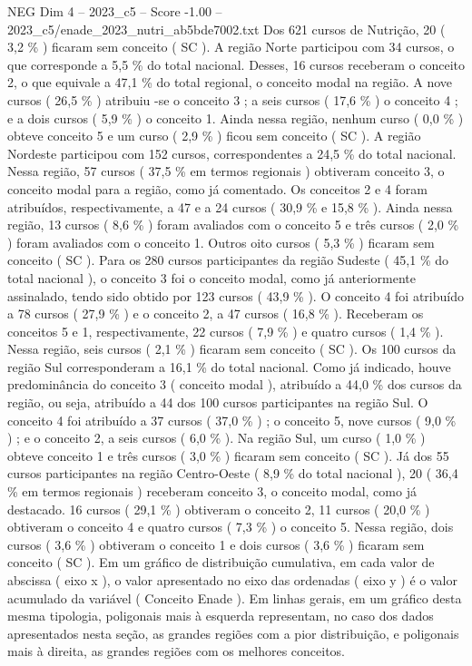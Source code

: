 \begin{textsample}{NEG Dim 4 – 2023\_c5 – Score -1.00 – 2023\_c5/enade\_2023\_nutri\_ab5bde7002.txt}
Dos 621 cursos de Nutrição, 20 ( 3,2 \% ) ficaram sem conceito ( SC ).
A região Norte participou com 34 cursos, o que corresponde a 5,5 \% do total nacional.
Desses, 16 cursos receberam o conceito 2, o que equivale a 47,1 \% do total regional, o conceito modal na região.
A nove cursos ( 26,5 \% ) atribuiu -se o conceito 3 ; a seis cursos ( 17,6 \% ) o conceito 4 ; e a dois cursos ( 5,9 \% ) o conceito 1.
Ainda nessa região, nenhum curso ( 0,0 \% ) obteve conceito 5 e um curso ( 2,9 \% ) ficou sem conceito ( SC ).
A região Nordeste participou com 152 cursos, correspondentes a 24,5 \% do total nacional.
Nessa região, 57 cursos ( 37,5 \% em termos regionais ) obtiveram conceito 3, o conceito modal para a região, como já comentado.
Os conceitos 2 e 4 foram atribuídos, respectivamente, a 47 e a 24 cursos ( 30,9 \% e 15,8 \% ).
Ainda nessa região, 13 cursos ( 8,6 \% ) foram avaliados com o conceito 5 e três cursos ( 2,0 \% ) foram avaliados com o conceito 1.
Outros oito cursos ( 5,3 \% ) ficaram sem conceito ( SC ).
Para os 280 cursos participantes da região Sudeste ( 45,1 \% do total nacional ), o conceito 3 foi o conceito modal, como já anteriormente assinalado, tendo sido obtido por 123 cursos ( 43,9 \% ).
O conceito 4 foi atribuído a 78 cursos ( 27,9 \% ) e o conceito 2, a 47 cursos ( 16,8 \% ).
Receberam os conceitos 5 e 1, respectivamente, 22 cursos ( 7,9 \% ) e quatro cursos ( 1,4 \% ).
Nessa região, seis cursos ( 2,1 \% ) ficaram sem conceito ( SC ).
Os 100 cursos da região Sul corresponderam a 16,1 \% do total nacional.
Como já indicado, houve predominância do conceito 3 ( conceito modal ), atribuído a 44,0 \% dos cursos da região, ou seja, atribuído a 44 dos 100 cursos participantes na região Sul.
O conceito 4 foi atribuído a 37 cursos ( 37,0 \% ) ; o conceito 5, nove cursos ( 9,0 \% ) ; e o conceito 2, a seis cursos ( 6,0 \% ).
Na região Sul, um curso ( 1,0 \% ) obteve conceito 1 e três cursos ( 3,0 \% ) ficaram sem conceito ( SC ).
Já dos 55 cursos participantes na região Centro-Oeste ( 8,9 \% do total nacional ), 20 ( 36,4 \% em termos regionais ) receberam conceito 3, o conceito modal, como já destacado. 16 cursos ( 29,1 \% ) obtiveram o conceito 2, 11 cursos ( 20,0 \% ) obtiveram o conceito 4 e quatro cursos ( 7,3 \% ) o conceito 5.
Nessa região, dois cursos ( 3,6 \% ) obtiveram o conceito 1 e dois cursos ( 3,6 \% ) ficaram sem conceito ( SC ).
Em um gráfico de distribuição cumulativa, em cada valor de abscissa ( eixo x ), o valor apresentado no eixo das ordenadas ( eixo y ) é o valor acumulado da variável ( Conceito Enade ).
Em linhas gerais, em um gráfico desta mesma tipologia, poligonais mais à esquerda representam, no caso dos dados apresentados nesta seção, as grandes regiões com a pior distribuição, e poligonais mais à direita, as grandes regiões com os melhores conceitos.

\end{textsample}
